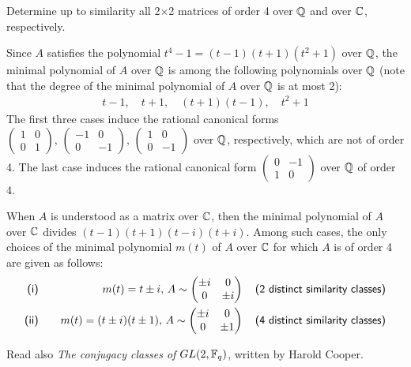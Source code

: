 \begin{prob}
    Determine up to similarity all 2$\times$2 matrices of order 4 over ${\mathbb{Q}}$ and over ${\mathbb{C}}$, respectively.
\end{prob}
\begin{sol}
    Since $A$ satisfies the polynomial $t^4-1=(t-1)(t+1)(t^2+1)$ over ${\mathbb{Q}}$, the minimal polynomial of $A$ over ${\mathbb{Q}}$ is among the following polynomials over ${\mathbb{Q}}$ (note that the degree of the minimal polynomial of $A$ over ${\mathbb{Q}}$ is at most 2):
    \begin{align*}
        t-1,\quad t+1,\quad (t+1)(t-1),\quad t^2+1
    \end{align*}
    The first three cases induce the rational canonical forms $\begin{pmatrix}1&0\\0&1\end{pmatrix},\,\begin{pmatrix}-1&0\\0&-1\end{pmatrix},\,\begin{pmatrix}1&0\\0&-1\end{pmatrix}$ over ${\mathbb{Q}}$, respectively, which are not of order 4.
    The last case induces the rational canonical form $\begin{pmatrix}0&-1\\1&0\end{pmatrix}$ over ${\mathbb{Q}}$ of order 4.

    When $A$ is understood as a matrix over ${\mathbb{C}}$, then the minimal polynomial of $A$ over ${\mathbb{C}}$ divides $(t-1)(t+1)(t-i)(t+i)$.
    Among such cases, the only choices of the minimal polynomial $m(t)$ of $A$ over ${\mathbb{C}}$ for which $A$ is of order 4 are given as follows:
    \begin{eqnarray*}
        \textsf{(\romannumeral 1)}&\quad&m(t)=t\pm i,\, A\sim\begin{pmatrix}\pm i&0\\0&\pm i\end{pmatrix}\quad\textsf{(2 distinct similarity classes)}\\
        \textsf{(\romannumeral 2)}&\quad&m(t)=(t\pm i)(t\pm 1),\, A\sim\begin{pmatrix}\pm i&0\\0&\pm 1\end{pmatrix}\quad\textsf{(4 distinct similarity classes)}
    \end{eqnarray*}
\end{sol}

Read also \textit{The conjugacy classes of $GL(2, {\mathbb{F}}_q)$}, written by Harold Cooper.